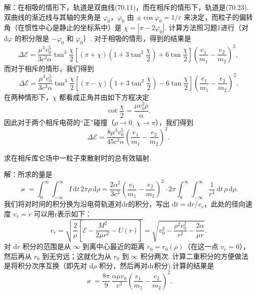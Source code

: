 \begin{xiti}
解：在相吸的情形下，轨道是双曲线(70.11)，而在相斥的情形下，轨道是(70.23).双曲线的渐近线与其轴的夹角是 $\varphi_0$，$\varphi_0$ 由 $\pm\cos\varphi_0=1/\varepsilon$ 来决定，而粒子的偏转角（在惯性中心是静止的坐标系中）是 $\chi=|\pi-2\varphi_0|$. 计算方法照习题1进行（对 $\mathrm{d}\varphi$ 的积分限是 $-\varphi_0$ 和 $\varphi_0$）. 对于相吸的情形，得到的结果是
\begin{equation*}
  \Delta\mathcal{E}=\frac{\mu^3v_0^5}{3c^3\alpha}\tan^3\frac{\chi}{2}
  \left[(\pi+\chi)\left(1+3\tan^2\frac{\chi}{2}\right)+6\tan\frac{\chi}{2}\right]
  \left(\frac{e_1}{m_1}-\frac{e_2}{m_2}\right)^2,
\end{equation*}
而对于相斥的情形，我们得到
\begin{equation*}
  \Delta\mathcal{E}=\frac{\mu^3v_0^5}{3c^3\alpha}\tan^3\frac{\chi}{2}
  \left[(\pi-\chi)\left(1+3\tan^2\frac{\chi}{2}\right)-6\tan\frac{\chi}{2}\right]
  \left(\frac{e_1}{m_1}-\frac{e_2}{m_2}\right)^2.
\end{equation*}
在两种情形下，$\chi$ 都看成正角并由如下方程决定
\begin{equation*}
  \cot\frac{\chi}{2}=\frac{\mu v_0^2\rho}{\alpha}.
\end{equation*}
因此对于两个相斥电荷的“正”碰撞（$\rho\to0$, $\chi\to\pi$），我们得到
\begin{equation*}
  \Delta\mathcal{E}=\frac{8\mu^3v_0^5}{45c^3\alpha}\left(\frac{e_1}{m_1}-\frac{e_2}{m_2}\right)^2.
\end{equation*}

\quad 求在相斥库仑场中一粒子束散射时的总有效辐射.

解：所求的量是
\begin{equation*}
  \varkappa=\int_0^{\infty}\!\!\int_{-\infty}^{\infty}I\,\mathrm{d}t\,2\pi\rho\,\mathrm{d}\rho
  =\frac{2\alpha^2}{3c^3}\left(\frac{e_1}{m_1}-\frac{e_2}{m_2}\right)^2
  \cdot 2\pi\int_0^{\infty}\!\!\int_{-\infty}^{\infty}\frac{1}{r^4}\,\mathrm{d}t\,\rho\,\mathrm{d}\rho.
\end{equation*}
我们将对时间的积分换为沿电荷轨道对dr的积分，写出 $\mathrm{d}t=\mathrm{d}r/v_r$，此处的径向速度 $v_r=\dot{r}$ 可以用r表示如下：
\begin{equation*}
  v_r=\sqrt{\frac{2}{\mu}\left[\mathcal{E}-\frac{M^2}{2\mu r^2}-U(r)\right]}
  =\sqrt{v_0^2-\frac{\rho^2v_0^2}{r^2}-\frac{2\alpha}{\mu r}}.
\end{equation*}
对 $\mathrm{d}r$ 积分的范围是从 $\infty$ 到离中心最近的距离 $r_0=r_0(\rho)$（在这一点 $v_r=0$），然后再从 $r_0$ 到无穷远；这就化为从 $r_0$ 到 $\infty$ 积分两次. 计算二重积分的方便做法是将积分次序互换（即先对 $\mathrm{d}\rho$ 积分，然后再对dr积分).计算的结果是
\begin{equation*}
  \varkappa=\frac{8\pi}{9}\,\frac{\alpha\mu v_0}{c^3}\left(\frac{e_1}{m_1}-\frac{e_2}{m_2}\right)^2.
\end{equation*}


\end{xiti}

